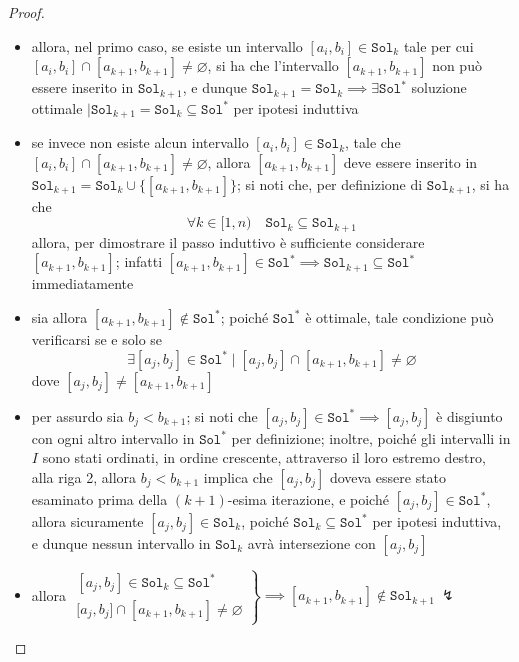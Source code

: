 \documentclass[a4paper, 12pt]{report}
\begin{document}
\begin{proof}
\begin{itemize}
\begin{itemize}
                    \item allora, nel primo caso, se esiste un intervallo $[a_i, b_i] \in \texttt{Sol}_k$ tale per cui $[a_i, b_i] \cap [a_{k + 1}, b_{k + 1}] \neq \varnothing$, si ha che l'intervallo $[a_{k + 1}, b_{k + 1}]$ non può essere inserito in $\texttt{Sol}_{k + 1}$, e dunque $\texttt{Sol}_{k + 1} = \texttt{Sol}_k \implies \exists \texttt{Sol}^*$ soluzione ottimale $\mid \texttt{Sol}_{k + 1} = \texttt{Sol}_k \subseteq \texttt{Sol}^*$ per ipotesi induttiva
                    \item se invece non esiste alcun intervallo $[a_i, b_i] \in \texttt{Sol}_k$, tale che $[a_i, b_i] \cap [a_{k + 1}, b_{k + 1}] \neq \varnothing$, allora $[a_{k + 1}, b_{k + 1}]$ deve essere inserito in $\texttt{Sol}_{k + 1} = \texttt{Sol}_k \cup \{[a_{k + 1}, b_{k + 1}]\}$; si noti che, per definizione di $\texttt{Sol}_{k + 1}$, si ha che $$\forall k \in [1, n) \quad \texttt{Sol}_k \subseteq \texttt{Sol}_{k + 1}$$ allora, per dimostrare il passo induttivo è sufficiente considerare $[a_{k + 1}, b_{k + 1}]$; infatti $[a_{k + 1}, b_{k + 1}] \in \texttt{Sol}^* \implies \texttt{Sol}_{k +1} \subseteq \texttt{Sol}^*$ immediatamente
                    \item sia allora $[a_{k +1}, b_{k +1}] \notin \texttt{Sol}^*$; poiché $\texttt{Sol}^*$ è ottimale, tale condizione può verificarsi se e solo se $$\exists [a_j, b_j] \in \texttt{Sol}^* \mid [a_j, b_j] \cap [a_{k +1}, b_{k +1}] \neq \varnothing$$
                    dove $[a_j, b_j] \neq [a_{k +1},b_{k +1}]$
                    \item per assurdo sia $b_j < b_{k + 1}$; si noti che $[a_j, b_j] \in \texttt{Sol}^* \implies [a_j, b_j]$ è disgiunto con ogni altro intervallo in $\texttt{Sol}^*$ per definizione; inoltre, poiché gli intervalli in $I$ sono stati ordinati, in ordine crescente, attraverso il loro estremo destro, alla riga 2, allora $b_j < b_{k + 1}$ implica che $[a_j, b_j]$ doveva essere stato esaminato prima della $(k + 1)$-esima iterazione, e poiché $[a_j, b_j] \in \texttt{Sol}^*$, allora sicuramente $[a_j, b_j] \in \texttt{Sol}_k$, poiché $\texttt{Sol}_k \subseteq \texttt{Sol}^*$ per ipotesi induttiva, e dunque nessun intervallo in $\texttt{Sol}_k$ avrà intersezione con $[a_j, b_j]$
                    \item allora $\left. \begin{array}{l} [a_j, b_j] \in \texttt{Sol}_k \subseteq \texttt{Sol}^* \\ {[}a_j, b_j] \cap [a_{k +1}, b_{k + 1}] \neq \varnothing \end{array}\right \} \implies [a_{k +1}, b_{k +1}] \notin \texttt{Sol}_{k +1} \ \lightning$ 

\end{itemize}
\end{itemize}
\end{proof}
\end{document}
